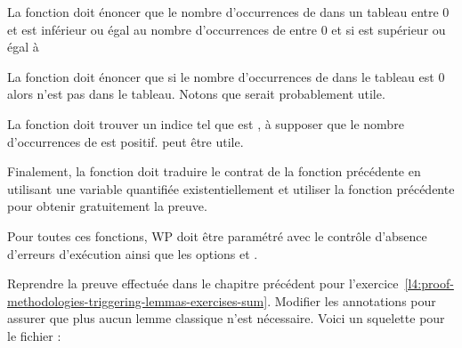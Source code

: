 La fonction  doit énoncer que le nombre d'occurrences
de  dans un tableau entre 0 et  est inférieur
ou égal au nombre d'occurrences de  entre 0 et  si
 est supérieur ou égal à 


La fonction  doit énoncer que si le nombre
d'occurrences de  dans le tableau est 0 alors  n'est
pas dans le tableau. Notons que  serait probablement
utile.


La fonction  doit trouver un indice 
tel que  est , à supposer que le nombre
d'occurrences de  est positif.  peut
être utile.


Finalement, la fonction  doit traduire le contrat
de la fonction précédente en utilisant une variable quantifiée existentiellement
et utiliser la fonction précédente pour obtenir gratuitement la preuve.


Pour toutes ces fonctions, WP doit être paramétré avec le contrôle d'absence
d'erreurs d'exécution ainsi que les options 
et .




Reprendre la preuve effectuée dans le chapitre précédent pour
l'exercice~\ref{l4:proof-methodologies-triggering-lemmas-exercises-sum}. Modifier
les annotations pour assurer que plus aucun lemme classique n'est nécessaire.
Voici un squelette pour le fichier :



